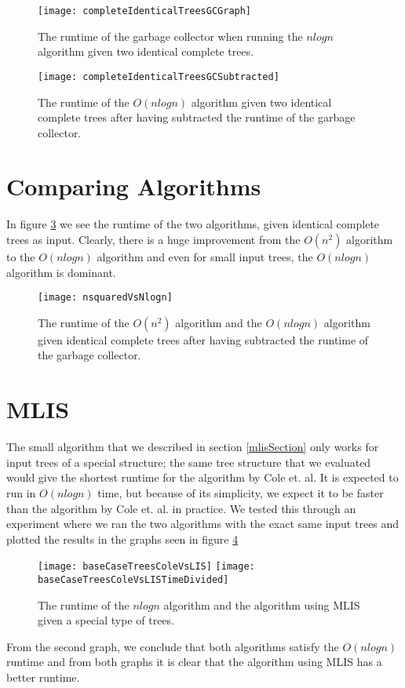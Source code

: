\begin{figure}
	\texttt{[image: completeIdenticalTreesGCGraph]}
	\caption{The runtime of the garbage collector when running the $nlogn$ algorithm given two identical complete trees.}
	\label{completeIdenticalTreesGCGraph}
\end{figure}
\begin{figure}
	\texttt{[image: completeIdenticalTreesGCSubtracted]}
	\caption{The runtime of the $O(nlogn)$ algorithm given two identical complete trees after having subtracted the runtime of the garbage collector.}
	\label{completeIdenticalTreesGCSubtractedGraph}
\end{figure}

\section{Comparing Algorithms}
In figure \ref{nsquaredVsNlognGraph} we see the runtime of the two algorithms, given identical complete trees as input. Clearly, there is a huge improvement from the $O(n^2)$ algorithm to the $O(nlogn)$ algorithm and even for small input trees, the $O(nlogn)$ algorithm is dominant.

\begin{figure}
	\texttt{[image: nsquaredVsNlogn]}
	\caption{The runtime of the $O(n^2)$ algorithm and the $O(nlogn)$ algorithm given identical complete trees after having subtracted the runtime of the garbage collector.}
	\label{nsquaredVsNlognGraph}
\end{figure}

\section{MLIS}
The small algorithm that we described in section \ref{mlisSection} only works for input trees of a special structure; the same tree structure that we evaluated would give the shortest runtime for the algorithm by Cole et. al. It is expected to run in $O(nlogn)$ time, but because of its simplicity, we expect it to be faster than the algorithm by Cole et. al. in practice. We tested this through an experiment where we ran the two algorithms with the exact same input trees and plotted the results in the graphs seen in figure \ref{baseCaseTreesColeVsLIS}

\begin{figure}
	\texttt{[image: baseCaseTreesColeVsLIS]}
	\texttt{[image: baseCaseTreesColeVsLISTimeDivided]}
	\caption{The runtime of the $nlogn$ algorithm and the algorithm using MLIS given a special type of trees.}
	\label{baseCaseTreesColeVsLIS}
\end{figure}

From the second graph, we conclude that both algorithms satisfy the $O(nlogn)$ runtime and from both graphs it is clear that the algorithm using MLIS has a better runtime.




